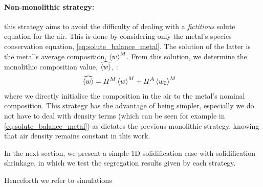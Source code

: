\paragraph{Non-monolithic strategy:}
this strategy aims to avoid the difficulty of dealing with a \emph{fictitious} solute equation for the air.
This is done by considering only the metal's species conservation equation, \cref{eq:solute_balance_metal}.
The solution of the latter is the metal's average composition, $\left \langle w \right \rangle^M$. From this solution, we determine the monolithic
composition value, $\widehat{\left \langle w \right \rangle}$, :  
\begin{align}
\label{eq:nonmonolithic_solute}
& \widehat{\left \langle w \right \rangle} = H^M \left \langle w \right \rangle^M + H^A \left \langle w_0 \right \rangle^M     
\end{align}
where we directly initialise the composition in the air to the metal's nominal composition.
This strategy has the advantage of being simpler, especially we do not have to deal with density terms
(which can be seen for example in \cref{eq:solute_balance_metal}) 
as dictates the previous monolithic strategy, knowing that air density remains constant in this work.

In the next section, we present a simple 1D solidification case with solidification shrinkage, in which we test
the segregation results given by each strategy.


Henceforth we refer to simulations 


